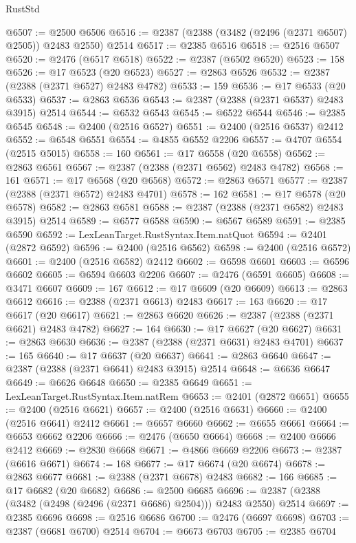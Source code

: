 \begin{lexlean}{RustStd}
\begin{coremodule}
{\begin{coremodule}
{{{{{{{{{{{{{{{{{{{{{{{{{{{{{{{{{{{{{{{{{{{{{{{{{{@6507 := @2500 @6506
@6516 := @2387 (@2388 (@3482 (@2496 (@2371 @6507) @2505)) @2483 @2550) @2514
@6517 := @2385 @6516
@6518 := @2516 @6507
@6520 := @2476 (@6517 @6518)
@6522 := @2387 (@6502 @6520)
@6523 := 158
@6526 := @17 @6523 (@20 @6523)
@6527 := @2863 @6526
@6532 := @2387 (@2388 (@2371 @6527) @2483 @4782)
@6533 := 159
@6536 := @17 @6533 (@20 @6533)
@6537 := @2863 @6536
@6543 := @2387 (@2388 (@2371 @6537) @2483 @3915) @2514
@6544 := @6532 @6543
@6545 := @6522 @6544
@6546 := @2385 @6545
@6548 := @2400 (@2516 @6527)
@6551 := @2400 (@2516 @6537) @2412
@6552 := @6548 @6551
@6554 := @4855 @6552 @2206
@6557 := @4707 @6554 (@2515 @5015)
@6558 := 160
@6561 := @17 @6558 (@20 @6558)
@6562 := @2863 @6561
@6567 := @2387 (@2388 (@2371 @6562) @2483 @4782)
@6568 := 161
@6571 := @17 @6568 (@20 @6568)
@6572 := @2863 @6571
@6577 := @2387 (@2388 (@2371 @6572) @2483 @4701)
@6578 := 162
@6581 := @17 @6578 (@20 @6578)
@6582 := @2863 @6581
@6588 := @2387 (@2388 (@2371 @6582) @2483 @3915) @2514
@6589 := @6577 @6588
@6590 := @6567 @6589
@6591 := @2385 @6590
@6592 := LexLeanTarget.RustSyntax.Item.natQuot
@6594 := @2401 (@2872 @6592)
@6596 := @2400 (@2516 @6562)
@6598 := @2400 (@2516 @6572)
@6601 := @2400 (@2516 @6582) @2412
@6602 := @6598 @6601
@6603 := @6596 @6602
@6605 := @6594 @6603 @2206
@6607 := @2476 (@6591 @6605)
@6608 := @3471 @6607
@6609 := 167
@6612 := @17 @6609 (@20 @6609)
@6613 := @2863 @6612
@6616 := @2388 (@2371 @6613) @2483
@6617 := 163
@6620 := @17 @6617 (@20 @6617)
@6621 := @2863 @6620
@6626 := @2387 (@2388 (@2371 @6621) @2483 @4782)
@6627 := 164
@6630 := @17 @6627 (@20 @6627)
@6631 := @2863 @6630
@6636 := @2387 (@2388 (@2371 @6631) @2483 @4701)
@6637 := 165
@6640 := @17 @6637 (@20 @6637)
@6641 := @2863 @6640
@6647 := @2387 (@2388 (@2371 @6641) @2483 @3915) @2514
@6648 := @6636 @6647
@6649 := @6626 @6648
@6650 := @2385 @6649
@6651 := LexLeanTarget.RustSyntax.Item.natRem
@6653 := @2401 (@2872 @6651)
@6655 := @2400 (@2516 @6621)
@6657 := @2400 (@2516 @6631)
@6660 := @2400 (@2516 @6641) @2412
@6661 := @6657 @6660
@6662 := @6655 @6661
@6664 := @6653 @6662 @2206
@6666 := @2476 (@6650 @6664)
@6668 := @2400 @6666 @2412
@6669 := @2830 @6668
@6671 := @4866 @6669 @2206
@6673 := @2387 (@6616 @6671)
@6674 := 168
@6677 := @17 @6674 (@20 @6674)
@6678 := @2863 @6677
@6681 := @2388 (@2371 @6678) @2483
@6682 := 166
@6685 := @17 @6682 (@20 @6682)
@6686 := @2500 @6685
@6696 := @2387 (@2388 (@3482 (@2498 (@2496 (@2371 @6686) @2504))) @2483 @2550) @2514
@6697 := @2385 @6696
@6698 := @2516 @6686
@6700 := @2476 (@6697 @6698)
@6703 := @2387 (@6681 @6700) @2514
@6704 := @6673 @6703
@6705 := @2385 @6704
}}}}}}}}}}}}}}}}}}}}}}}}}}}}}}}}}}}}}}}}}}}}}}}}}}
\end{coremodule}}
\end{coremodule}
\end{lexlean}
